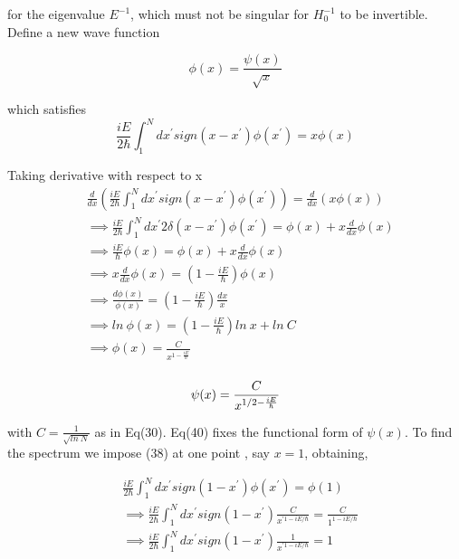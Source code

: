 \documentclass[12pt]{report}
\newcommand*{\1}{\hspace{1pt}}
\begin{document}
        for the eigenvalue $E^{-1}$, which must not be singular for $H_{0}^{-1}$ to be invertible. Define a new wave function 
    
        \begin{equation}
            \phi (x) = \frac{\psi (x)}{\sqrt{x}}
        \end{equation}

        which satisfies 
        \begin{equation}
            \frac{iE}{2\hbar} \int _{1}^{N} dx^{'}sign(x-x^{'})\phi(x^{'})= x\phi(x)
        \end{equation}

        Taking derivative with respect to x 
        \begin{equation}
            \begin{split}
                &\frac{d}{dx}\left(\frac{iE}{2\hbar} \int _{1}^{N} dx^{'}sign(x-x^{'})\phi(x^{'})\right)= \frac{d}{dx}\left( x\phi(x) \right) \\ 
                &\implies \frac{iE}{2\hbar} \int _{1}^{N} dx^{'}2\delta(x-x^{'})\phi(x^{'}) = \phi(x) + x \frac{d}{dx} \phi(x)  \\
                &\implies \frac{iE}{\hbar} \phi(x) = \phi(x) + x \frac{d}{dx} \phi(x)  \\
                &\implies x \frac{d}{dx} \phi(x) = \left(1 - \frac{iE}{\hbar}\right) \phi(x)   \\
                &\implies \frac{d\phi(x)}{\phi(x)} = \left(1 - \frac{iE}{\hbar}\right) \frac{dx}{x}   \\
                &\implies ln \ \phi(x) = \left(1 - \frac{iE}{\hbar}\right) ln \ x + ln \ C   \\
                &\implies \phi(x) = \frac{C}{x^{1 - \frac{iE}{\hbar}}}    \\
            \end{split}
        \end{equation}

        \begin{equation}
            \psi(x) = \frac{C}{x^{1/2 - \frac{iE}{\hbar}}}    \\
        \end{equation}

        with $C=\frac{1}{\sqrt{ln \  N}}$ as in Eq(30). Eq(40) fixes the functional form of $\psi(x)$. To find the spectrum we impose (38) at one point , say $x=1$, 
        obtaining,

        \begin{equation}
            \begin{split}
                &\frac{iE}{2\hbar} \int _{1}^{N} dx^{'} sign(1-x^{'}) \phi(x^{'}) = \phi(1) \\ 
                & \implies \frac{iE}{2\hbar} \int _{1}^{N} dx^{'} sign(1-x^{'}) \frac{C}{x^{' 1 - iE/\hbar}} = \frac{C}{1^{1 - iE/\hbar}} \\
                & \implies \frac{iE}{2\hbar} \int _{1}^{N} dx^{'} sign(1-x^{'}) \frac{1}{x^{' 1 - iE/\hbar}} = 1\\
            \end{split}
        \end{equation}
\end{document}

